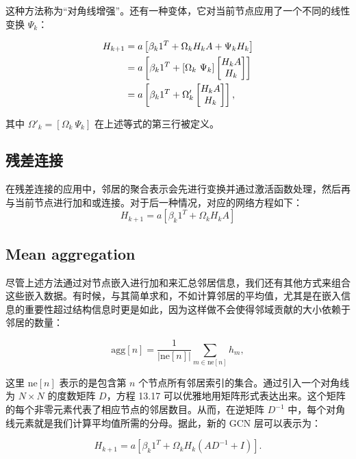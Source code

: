 这种方法称为“对角线增强”。还有一种变体，它对当前节点应用了一个不同的线性变换 \(\Psi_k\)：


\begin{align}
H_{k+1} &= a \left[ \beta_{k} 1^T + \Omega_k H_k A + \Psi_k H_k \right] \notag \\
&= a \left[ \beta_{k} 1^T + \left[ \Omega_k \ \Psi_k \right] \begin{bmatrix} H_k A \\ H_k \end{bmatrix} \right] \notag \\
&= a \left[ \beta_{k} 1^T + \Omega'_k \begin{bmatrix} H_k A \\ H_k \end{bmatrix} \right], 
\end{align} 


其中 \(\Omega'_k = \left[ \Omega_k \ \Psi_k \right]\) 在上述等式的第三行被定义。

\subsection{残差连接}
在残差连接的应用中，邻居的聚合表示会先进行变换并通过激活函数处理，然后再与当前节点进行加和或连接。对于后一种情况，对应的网络方程如下：
\begin{equation}
H_{k+1} = a \left[ \beta_k 1^T + \Omega_k H_k A \right] 
\end{equation}
\subsection{Mean aggregation}
尽管上述方法通过对节点嵌入进行加和来汇总邻居信息，我们还有其他方式来组合这些嵌入数据。有时候，与其简单求和，不如计算邻居的平均值，尤其是在嵌入信息的重要性超过结构信息时更是如此，因为这样做不会使得邻域贡献的大小依赖于邻居的数量：

\begin{equation}
\text{agg}[n] = \frac{1}{|\text{ne}[n]|} \sum_{m \in \text{ne}[n]} h_m, 
\end{equation}

这里 \(\text{ne}[n]\) 表示的是包含第 \(n\) 个节点所有邻居索引的集合。通过引入一个对角线为 \(N \times N\) 的度数矩阵 \(D\)，方程 13.17 可以优雅地用矩阵形式表达出来。这个矩阵的每个非零元素代表了相应节点的邻居数目。从而，在逆矩阵 \(D^{-1}\) 中，每个对角线元素就是我们计算平均值所需的分母。据此，新的 GCN 层可以表示为：

\begin{equation}
H_{k+1} = a \left[ \beta_k 1^T + \Omega_k H_k (AD^{-1} + I) \right]. 
\end{equation}
